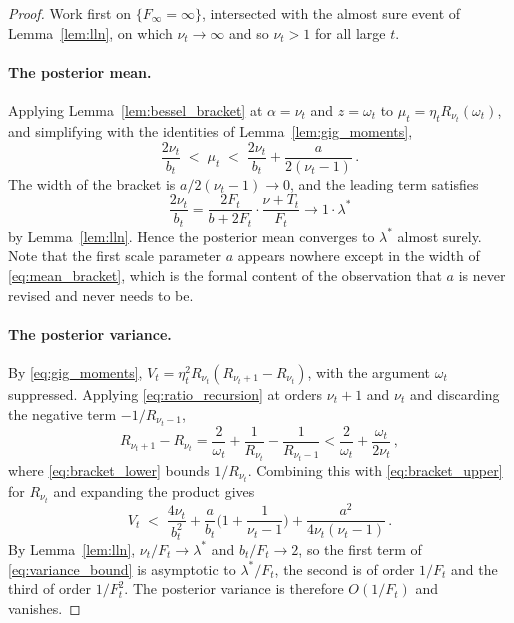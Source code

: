 \documentclass[twoside]{article}
\theoremstyle{plain}
\theoremstyle{definition}
\theoremstyle{remark}
\begin{document}
\begin{proof}
    Work first on $\{F_{\infty} = \infty\}$, intersected with the almost sure event of Lemma~\ref{lem:lln}, on which $\nu_t \to \infty$ and so $\nu_t > 1$ for all large $t$.

    \paragraph{The posterior mean.}
    Applying Lemma~\ref{lem:bessel_bracket} at $\alpha = \nu_t$ and $z = \omega_t$ to $\mu_t = \eta_t R_{\nu_t}(\omega_t)$, and simplifying with the identities of Lemma~\ref{lem:gig_moments},
    \begin{equation}
        \frac{2 \nu_t}{b_t} \; < \; \mu_t \; < \; \frac{2 \nu_t}{b_t} + \frac{a}{2 (\nu_t - 1)} \,.
        \label{eq:mean_bracket}
    \end{equation}
    The width of the bracket is $a / 2(\nu_t - 1) \to 0$, and the leading term satisfies
    \begin{equation}
        \frac{2 \nu_t}{b_t} = \frac{2 F_t}{b + 2 F_t} \cdot \frac{\nu + T_t}{F_t} \longrightarrow 1 \cdot \lambda^{*}
        \label{eq:mean_limit}
    \end{equation}
    by Lemma~\ref{lem:lln}.
    Hence the posterior mean converges to $\lambda^{*}$ almost surely.
    Note that the first scale parameter $a$ appears nowhere except in the width of \eqref{eq:mean_bracket}, which is the formal content of the observation that $a$ is never revised and never needs to be.

    \paragraph{The posterior variance.}
    By \eqref{eq:gig_moments}, $V_t = \eta_t^{2} R_{\nu_t}(R_{\nu_t + 1} - R_{\nu_t})$, with the argument $\omega_t$ suppressed.
    Applying \eqref{eq:ratio_recursion} at orders $\nu_t + 1$ and $\nu_t$ and discarding the negative term $-1/R_{\nu_t - 1}$,
    \begin{equation*}
        R_{\nu_t + 1} - R_{\nu_t} = \frac{2}{\omega_t} + \frac{1}{R_{\nu_t}} - \frac{1}{R_{\nu_t - 1}} < \frac{2}{\omega_t} + \frac{\omega_t}{2 \nu_t} \,,
    \end{equation*}
    where \eqref{eq:bracket_lower} bounds $1 / R_{\nu_t}$.
    Combining this with \eqref{eq:bracket_upper} for $R_{\nu_t}$ and expanding the product gives
    \begin{equation}
        V_t \; < \; \frac{4 \nu_t}{b_t^{2}} + \frac{a}{b_t} \Big( 1 + \frac{1}{\nu_t - 1} \Big) + \frac{a^{2}}{4 \nu_t (\nu_t - 1)} \,.
        \label{eq:variance_bound}
    \end{equation}
    By Lemma~\ref{lem:lln}, $\nu_t / F_t \to \lambda^{*}$ and $b_t / F_t \to 2$, so the first term of \eqref{eq:variance_bound} is asymptotic to $\lambda^{*} / F_t$, the second is of order $1/F_t$ and the third of order $1/F_t^{2}$.
    The posterior variance is therefore $O(1/F_t)$ and vanishes.


\end{proof}
\end{document}
